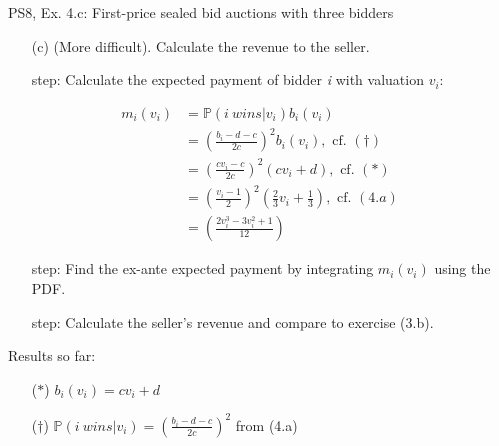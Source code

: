 \begin{frame}{PS8, Ex. 4.c: First-price sealed bid auctions with three bidders}
    \begin{itemize}
      \item[(c)] (More difficult). Calculate the revenue to the seller.
    \end{itemize}
    \vspace{-8pt}
    \begin{multicols}{2}
      \begin{itemize}
        \item[\nth{1} step:] Calculate the expected payment of bidder \textit{i} with valuation $v_i$:
      \end{itemize}
      \vspace{-14pt}
      \begin{align*}
        m_i(v_i)&=\mathbb{P}(i\ wins|v_i)b_i(v_i)\\
                &=\left(\frac{b_i-d-c}{2c}\right)^2b_i(v_i),\text{ cf. }(\dagger)\\
                &=\left(\frac{cv_i-c}{2c}\right)^2(cv_i+d),\text{ cf. }(*)\\
                &=\left(\frac{v_i-1}{2}\right)^2\left(\frac{2}{3}v_i+\frac{1}{3}\right),\text{ cf. }(4.a)\\
                &=\left(\frac{2v_i^3-3v_i^2+1}{12}\right)
      \end{align*}
      \vspace{-14pt}
      \begin{itemize}
        \item[\nth{2} step:] Find the ex-ante expected payment by integrating $m_i(v_i)$ using the PDF.
      \end{itemize}
      \vspace{-4pt}
      \vspace{-4pt}
      \begin{itemize}
        \item[\nth{3} step:] Calculate the seller's revenue and compare to exercise (3.b).
      \end{itemize}
      \vfill\null\columnbreak
      Results so far:
      \vspace{-6pt}
      \begin{itemize}
        \item[($*$)] $b_i(v_i) = cv_i+d$
        \item[($\dagger$)] $\mathbb{P}(i\ wins|v_i)=\left(\frac{b_i-d-c}{2c}\right)^2$ from (4.a)

\end{itemize}
\end{multicols}
\end{frame}
